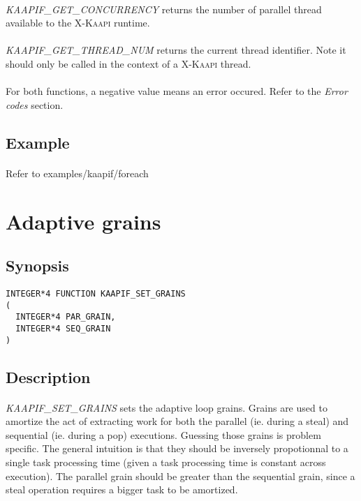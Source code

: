 \documentclass[a4paper, 11pt]{article}
\newcommand{\kaapi}{\textsc{X-Kaapi}\xspace}
\begin{document}
\paragraph{}
\textit{KAAPIF\_GET\_CONCURRENCY} returns the number of parallel thread available
to the \kaapi runtime.
\paragraph{}
\textit{KAAPIF\_GET\_THREAD\_NUM} returns the current thread identifier. Note it
should only be called in the context of a \kaapi thread.
\paragraph{}
For both functions, a negative value means an error occured. Refer to the
\textit{Error codes} section.

\subsection{Example}
\paragraph{}
Refer to examples/kaapif/foreach


\newpage
\section{Adaptive grains}

\subsection{Synopsis}
\begin{small}
\lstset{language=C}
\begin{lstlisting}[frame=tb]
INTEGER*4 FUNCTION KAAPIF_SET_GRAINS
(
  INTEGER*4 PAR_GRAIN,
  INTEGER*4 SEQ_GRAIN
)
\end{lstlisting}
\end{small}

\subsection{Description}
\paragraph{}
\textit{KAAPIF\_SET\_GRAINS} sets the adaptive loop grains. Grains are used
to amortize the act of extracting work for both the parallel (ie. during a
steal) and sequential (ie. during a pop) executions. Guessing those grains
is problem specific. The general intuition is that they should be inversely
propotionnal to a single task processing time (given a task processing time
is constant across execution). The parallel grain should be greater than the
sequential grain, since a steal operation requires a bigger task to be amortized.
\end{document}
